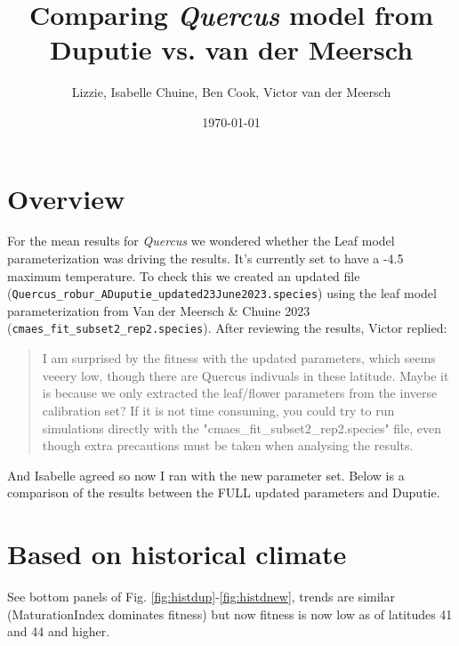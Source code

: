 \documentclass[11pt,letter]{article}
\begin{document}

\renewcommand{\refname}{\CHead{}}

\title{Comparing \emph{Quercus} model from \\ Duputie vs. van der Meersch}
\author{Lizzie, Isabelle Chuine, Ben Cook, Victor van der Meersch}
\date{\today}
\maketitle

\section*{Overview}
For the mean results for \emph{Quercus} we wondered whether the Leaf model parameterization was driving the results. It's currently set to have a -4.5 maximum temperature. To check this we created an updated file (\verb|Quercus_robur_ADuputie_updated23June2023.species|) using the leaf model parameterization from Van der Meersch \& Chuine 2023 (\verb|cmaes_fit_subset2_rep2.species|). After reviewing the results, Victor replied:

\begin{quote}
I am surprised by the fitness with the updated parameters, which seems veeery low, though there are Quercus indivuals in these latitude.
Maybe it is because we only extracted the leaf/flower parameters from the inverse calibration set?
If it is not time consuming, you could try to run simulations directly with the "cmaes\_fit\_subset2\_rep2.species" file, even though extra precautions must be taken when analysing the results.
\end{quote}

And Isabelle agreed so now I ran with the new parameter set. Below is a comparison of the results between the FULL updated parameters and Duputie.

\section*{Based on historical climate}

See bottom panels of Fig. \ref{fig:histdup}-\ref{fig:histdnew}, trends are similar (MaturationIndex dominates fitness) but now fitness is now low as of latitudes 41 and 44 and higher.
\end{document}

